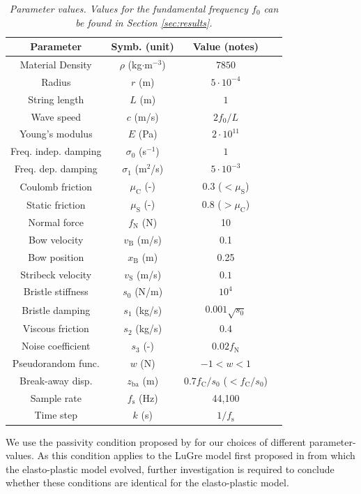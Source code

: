 \documentclass[twoside,a4paper,dvipsnames]{article}
\begin{document}
\begin{table}[ht]
  \caption{{\it Parameter values. Values for the fundamental frequency $f_0$ can be found in Section \ref{sec:results}.}}
	\centering
  \begin{tabular}{|c|c|c|c|}\hline
    Parameter & Symb. (unit) & Value (notes)\\ \hline
    Material Density &$\rho$ (kg$\cdot$m$^{-3}$) & $7850$ \\
    Radius & $r$ (m) & $5\cdot10^{-4}$\\
    String length & $L$ (m) & $1$ \\
    Wave speed & $c$ (m/s) & $2 f_0/L$\\
    Young's modulus & $E$ (Pa) & $2\cdot 10^{11}$\\
    Freq. indep. damping & $\sigma_0$ (s$^{-1}$) & $1$\\
    Freq. dep. damping & $\sigma_1$ (m$^{2}$/s) & $5 \cdot 10^{-3}$\\
    Coulomb friction & $\mu_\text{C}$ (-) & $0.3$ ($<\mu_\text{S}$) \\
    Static friction & $\mu_\text{S}$ (-) & $0.8$ ($>\mu_\text{C}$) \\
    Normal force & $f_\text{N}$ (N) & 10 \\
    Bow velocity & $v_\text{B}$ (m/s) & 0.1 \\
    Bow position & $x_\text{B}$ (m) & 0.25 \\
    Stribeck velocity & $v_\text{S}$ (m/s) & $0.1$ \\
    Bristle stiffness & $s_0$ (N/m)& $10^4$ \\
    Bristle damping & $s_1$ (kg/s)& $0.001\sqrt{s_0}$ \\
    Viscous friction & $s_2$ (kg/s) & $0.4$ \\
    Noise coefficient & $s_3$ (-) & $0.02f_\text{N}$\\
    Pseudorandom func. & $w$ (N) & $-1<w<1$\\
    Break-away disp.& $z_\text{ba}$ (m) & $0.7 f_\text{C}/s_0$ ($<f_\text{C}/s_0$) \\
    Sample rate & $f_\text{s}$ (Hz) & 44,100 \\
    Time step & $k$ (s) & $1/f_\text{s}$ \\
    \hline
 \end{tabular}
  \label{tab:parameters}
\end{table}
We use the passivity condition proposed by \cite{Astrom2008} for our choices of different parameter-values. As this condition applies to the LuGre model first proposed in \cite{Canudas1993, Canudas1995} from which the elasto-plastic model evolved, further investigation is required to conclude whether these conditions are identical for the elasto-plastic model.
\end{document}
